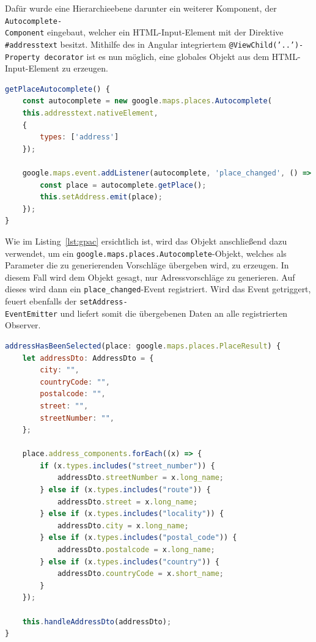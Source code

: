Dafür wurde eine Hierarchieebene darunter ein weiterer Komponent, der \texttt{Autocomplete-\\Component} eingebaut, welcher ein HTML-Input-Element mit der Direktive \texttt{\#addresstext} besitzt. Mithilfe des in Angular integriertem \texttt{@ViewChild('..')-Property decorator} ist es nun möglich, eine globales Objekt aus dem HTML-Input-Element zu erzeugen. 

\begin{lstlisting}[caption={Die \texttt{getPlaceAutocomplete()}-Methode der \texttt{AutocompleteComponent}-Klasse}, language=JavaScript,label={lst:gpac}]
getPlaceAutocomplete() {
	const autocomplete = new google.maps.places.Autocomplete(
	this.addresstext.nativeElement,
	{
		types: ['address']
	});
	
	google.maps.event.addListener(autocomplete, 'place_changed', () => {
		const place = autocomplete.getPlace();
		this.setAddress.emit(place);
	});
}
\end{lstlisting}

Wie im Listing~\ref{lst:gpac} ersichtlich ist, wird das Objekt anschließend dazu verwendet, um ein \texttt{google.maps.places.Autocomplete}-Objekt, welches als Parameter die zu generierenden Vorschläge übergeben wird, zu erzeugen. In diesem Fall wird dem Objekt gesagt, nur Adressvorschläge zu generieren. Auf dieses wird dann ein \texttt{place\_changed}-Event registriert. Wird das Event getriggert, feuert ebenfalls der \texttt{setAddress-\\EventEmitter} und liefert somit die übergebenen Daten an alle registrierten Observer.

\begin{lstlisting}[caption={Die \texttt{addressHasBeenSelected()}-Methode der \texttt{StreetComponent}-Klasse}, language=JavaScript,label={lst:gpac}]
addressHasBeenSelected(place: google.maps.places.PlaceResult) {
	let addressDto: AddressDto = {
		city: "",
		countryCode: "",
		postalcode: "",
		street: "",
		streetNumber: "",
	};
	
	place.address_components.forEach((x) => {
		if (x.types.includes("street_number")) {
			addressDto.streetNumber = x.long_name;
		} else if (x.types.includes("route")) {
			addressDto.street = x.long_name;
		} else if (x.types.includes("locality")) {
			addressDto.city = x.long_name;
		} else if (x.types.includes("postal_code")) {
			addressDto.postalcode = x.long_name;
		} else if (x.types.includes("country")) {
			addressDto.countryCode = x.short_name;
		}
	});
	
	this.handleAddressDto(addressDto);
}
\end{lstlisting}

